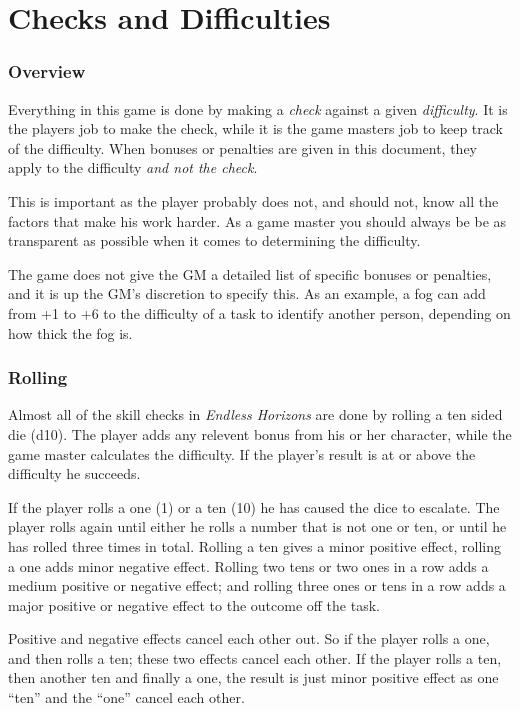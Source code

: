 \chapter{Checks and Difficulties}

\subsection{Overview}

Everything in this game is done by making a \emph{check} against a given
\emph{difficulty}. It is the players job to make the check, while it is the
game masters job to keep track of the difficulty. When bonuses or penalties
are given in this document, they apply to the difficulty \emph{and not the
  check}.

This is important as the player probably does not, and should not, know all
the factors that make his work harder. As a game master you should always be
be as transparent as possible when it comes to determining the difficulty.

The game does not give the GM a detailed list of specific bonuses or penalties,
and it is up the GM's discretion to specify this. As an example, a fog can
add from +1 to +6 to the difficulty of a task to identify another person,
depending on how thick the fog is.

\subsection{Rolling}

Almost all of the skill checks in \emph{Endless Horizons} are done by rolling
a ten sided die (d10). The player adds any relevent bonus from his or her
character, while the game master calculates the difficulty. If the player's
result is at or above the difficulty he succeeds.

If the player rolls a one (1) or a ten (10) he has caused the dice to escalate.
The player rolls again until either he rolls a number that is not one or ten,
or until he has rolled three times in total. Rolling a ten gives a minor
positive effect, rolling a one adds minor negative effect. Rolling two tens or
two ones in a row adds a medium positive or negative effect; and rolling three
ones or tens in a row adds a major positive or negative effect to the outcome
off the task.

Positive and negative effects cancel each other out. So if the player rolls a
one, and then rolls a ten; these two effects cancel each other. If the player
rolls a ten, then another ten and finally a one, the result is just minor
positive effect as one ``ten'' and the ``one'' cancel each other.

